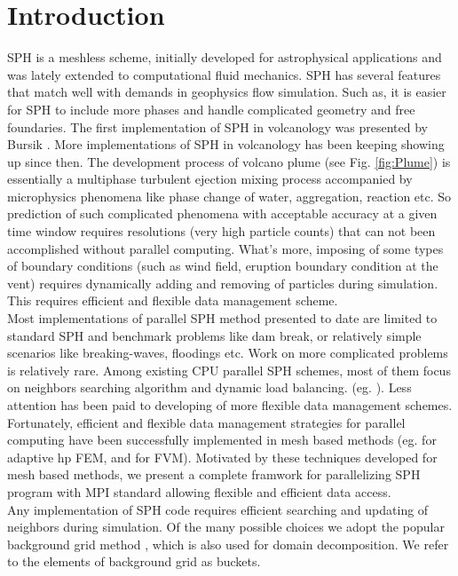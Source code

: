 \documentclass[procedia]{easychair}
\begin{document}
\section{Introduction}
\label{sect:introduction}
SPH is a meshless scheme, initially developed for astrophysical applications and was lately extended to computational fluid mechanics. SPH has several features that match well with demands in geophysics flow simulation. Such as, it is easier for SPH to include more phases and handle complicated geometry and free foundaries. The first implementation of SPH in volcanology was presented by Bursik \cite{bursik2003smoothed}. More implementations of SPH in volcanology \cite{mcdougall2004model,
 prakash2011three, haddad2016smoothed} has been keeping showing up since then. The development process of volcano plume (see Fig. \ref{fig:Plume}) is essentially a multiphase turbulent ejection mixing process accompanied by microphysics phenomena like phase change of water, aggregation, reaction etc. So prediction of such complicated phenomena with acceptable accuracy at a given time window requires resolutions (very high particle counts) that can not been accomplished without parallel computing. What's more, imposing of some types of boundary conditions (such as wind field, eruption boundary condition at the vent) requires dynamically adding and removing of particles during simulation. This requires efficient and flexible data management scheme.\\
Most implementations of parallel SPH method presented to date are limited to standard SPH and benchmark problems like dam break, or relatively
simple scenarios like breaking-waves, floodings etc. Work on more complicated problems is relatively rare. Among existing CPU parallel SPH schemes, most of them focus on neighbors searching algorithm and dynamic load balancing. (eg. \cite{ferrari2009new, crespo2015dualsphysics}). Less attention has been paid to developing of more flexible data management schemes. 
Fortunately, efficient and flexible data management strategies for parallel computing have been successfully implemented in mesh based methods (eg. \cite{laszloffy2000simple} for adaptive hp FEM, and \cite{patra2005parallel} for FVM). Motivated by these techniques developed for mesh based methods, we present a complete framwork for parallelizing SPH program with MPI standard allowing flexible and efficient data access.\\
Any implementation of SPH code requires efficient searching and updating of neighbors during simulation. Of the many possible choices we adopt the popular background grid method \cite{monaghan1985refined}, which is also used for domain decomposition. We refer to the elements of background grid as buckets. 
\end{document}
